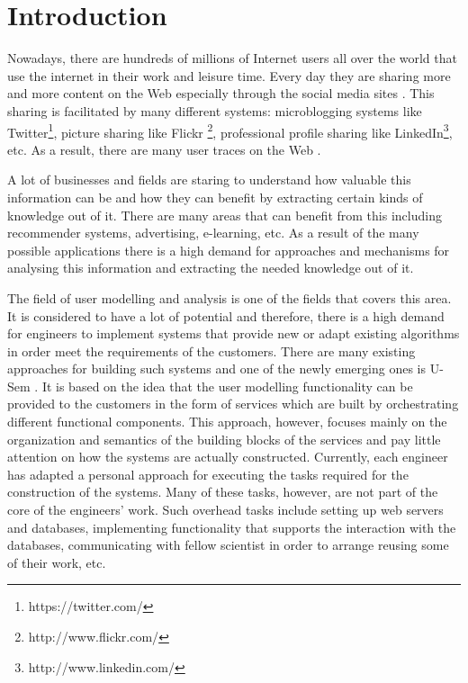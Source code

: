 
\chapter{\label{cha:intro}Introduction}

Nowadays, there are hundreds of millions of Internet users all over the world that use the internet in their work and leisure time. Every day they are sharing more and more content on the Web especially through the social media sites \cite{kaplan2010users}. This sharing is facilitated by many different systems: microblogging systems like Twitter\footnote{https://twitter.com/}, picture sharing like Flickr \footnote{http://www.flickr.com/}, professional profile sharing like LinkedIn\footnote{http://www.linkedin.com/}, etc. As a result, there are many user traces on the Web \cite{abel2010interweaving}.

A lot of businesses and fields are staring to understand how valuable this information can be and how they can benefit by extracting certain kinds of knowledge out of it. There are many areas that can benefit from this including recommender systems, advertising, e-learning, etc. As a result of the many possible applications there is a high demand for approaches and mechanisms for analysing this information and extracting the needed knowledge out of it. 

The field of user modelling and analysis is one of the fields that covers this area. It is considered to have a lot of potential \cite{brusilovsky2007adaptive} and therefore, there is a high demand for engineers to implement systems that provide new or adapt existing algorithms in order meet the requirements of the customers. There are many existing approaches for building such systems \cite{kobsa2001generic} and one of the newly emerging ones is U-Sem \cite{abel2011u}. It is based on the idea that the user modelling functionality can be provided to the customers in the form of services which are built by orchestrating different functional components. This approach, however, focuses mainly on the organization and semantics of the building blocks of the services and pay little attention on how the systems are actually constructed. Currently, each engineer has adapted a personal approach for executing the tasks required for the construction of the systems. Many of these tasks, however, are not part of the core of the engineers' work. Such overhead tasks include setting up web servers and databases, implementing functionality that supports the interaction with the databases, communicating with fellow scientist in order to arrange reusing some of their work, etc. 


